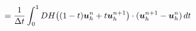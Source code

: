 \documentclass[preview]{standalone}
\newcommand{\bu}{\boldsymbol{u}_h}
\begin{document}
\begin{align*}
\special{dvisvgm:raw <g id='unique000'>}=\frac{1}{\Delta t}\int_0^1 DH\big((1-t)\bu^n+t\bu^{n+1}\big)\cdot(\bu^{n+1}-\bu^n)\,dt\special{dvisvgm:raw </g>}
\end{align*}
\end{document}
